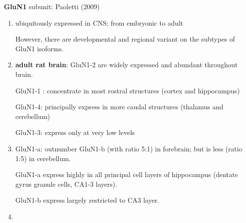 {\bf GluN1} subunit: Paoletti (2009)
\begin{enumerate}
  \item ubiquitously expressed in CNS; from embryonic to adult
  
  However, there are developmental and regional variant on the subtypes of GluN1
  isoforms.
  
  \item {\bf adult rat brain}: GluN1-2 are widely expressed and abundant
  throughout brain.
  
  GluN1-1 : concentrate in most rostral structures (cortex and hippocampus)
  
  GluN1-4: principally express in more caudal structures (thalamus and
  cerebellum)
  
  GluN1-3: express only at very low levels
  
  \item GluN1-a: outnumber GluN1-b (with ratio 5:1) in forebrain; but is less
  (ratio 1:5) in cerebellum.
  
  GluN1-a express highly in all principal cell layers of hippocampus (dentate
  gyrus granule cells, CA1-3 layers).
  
  GluN1-b express largely restricted to CA3 layer.
  
  \item 
\end{enumerate}


